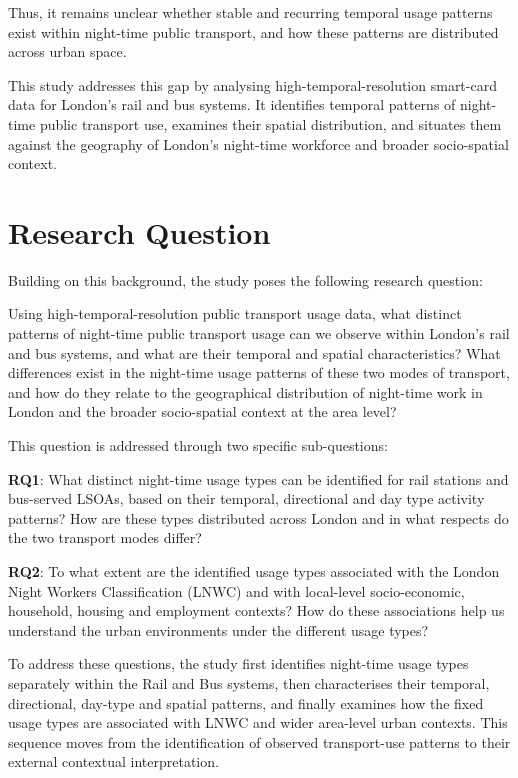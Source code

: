 Thus, it remains unclear whether stable and recurring temporal usage patterns exist within night-time public transport, and how these patterns are distributed across urban space.

This study addresses this gap by analysing high-temporal-resolution smart-card data for London's rail and bus systems. It identifies temporal patterns of night-time public transport use, examines their spatial distribution, and situates them against the geography of London's night-time workforce \citep{Mavrogeni2025} and broader socio-spatial context.

\section{Research Question}

Building on this background, the study poses the following research question:

Using high-temporal-resolution public transport usage data, what distinct patterns of night-time public transport usage can we observe within London's rail and bus systems, and what are their temporal and spatial characteristics? What differences exist in the night-time usage patterns of these two modes of transport, and how do they relate to the geographical distribution of night-time work in London and the broader socio-spatial context at the area level?

This question is addressed through two specific sub-questions:

\textbf{RQ1}: What distinct night-time usage types can be identified for rail stations and bus-served LSOAs, based on their temporal, directional and day type activity patterns? How are these types distributed across London and in what respects do the two transport modes differ?

\textbf{RQ2}: To what extent are the identified usage types associated with the London Night Workers Classification (LNWC) and with local-level socio-economic, household, housing and employment contexts? How do these associations help us understand the urban environments under the different usage types?

To address these questions, the study first identifies night-time usage types separately within the Rail and Bus systems, then characterises their temporal, directional, day-type and spatial patterns, and finally examines how the fixed usage types are associated with LNWC and wider area-level urban contexts. This sequence moves from the identification of observed transport-use patterns to their external contextual interpretation.

